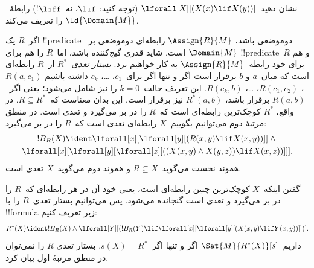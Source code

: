 \documentclass[../../../include/open-logic-section]{subfiles}
\begin{document}
\begin{prob}
نشان دهید~$\lforall[X][(X(x) \lif X(y))]$ (توجه کنید:
$\lif$، نه~$\liff$!) رابطهٔ~$\Id{\Domain{M}}$ را تعریف می‌کند.
\end{prob}

\begin{ex}
اگر~$R$ یک !!{predicate} دوموضعی باشد، $\Assign{R}{M}$ رابطه‌ای
دوموضعی بر~$\Domain{M}$ است. شاید قدری گیج‌کننده باشد، اما~$R$ را هم
برای !!{predicate}~$R$ و هم برای خود رابطهٔ~$\Assign{R}{M}$ به کار
خواهیم برد. \emph{بستار تعدی}~$R^*$ از~$R$ رابطه‌ای است که میان~$a$ و
$b$ برقرار است اگر و تنها اگر برای~$c_1$، \dots، $c_k$ داشته باشیم
$R(a,c_1)$، $R(c_1, c_2)$، \dots، $R(c_k,b)$. این تعریف حالت~$k = 0$
را نیز شامل می‌شود؛ یعنی اگر~$R(a,b)$ برقرار باشد، $R^*(a,b)$ نیز
برقرار است. این بدان معناست که~$R \subseteq R^*$. در واقع، $R^*$
کوچک‌ترین رابطه‌ای است که~$R$ را در بر می‌گیرد و تعدی است. در منطق
مرتبهٔ دوم می‌توانیم بگوییم~$X$ رابطه‌ای تعدی است که~$R$ را در بر
می‌گیرد:
\begin{multline*}
  !B_R(X) \ident \lforall[x][\lforall[y][(R(x,y) \lif X(x, y))]] \land {}\\
\lforall[x][\lforall[y][\lforall[z][((X(x,y) \land X(y,z)) \lif X(x,
      z))]]].
\end{multline*}
هموند نخست می‌گوید~$R \subseteq X$ و هموند دوم می‌گوید~$X$ تعدی است.

گفتن اینکه~$X$ کوچک‌ترین چنین رابطه‌ای است، یعنی خود آن در هر رابطه‌ای
که~$R$ را در بر می‌گیرد و تعدی است گنجانده می‌شود. پس می‌توانیم بستار
تعدی~$R$ را با !!{formula} زیر تعریف کنیم:
\[
R^*(X) \ident !B_R(X) \land \lforall[Y][(!B_R(Y) \lif
  \lforall[x][\lforall[y][(X(x, y) \lif Y(x,y))]])].
\]
داریم~$\Sat{M}{R^*(X)}[s]$ اگر و تنها اگر~$s(X) = R^*$. بستار تعدی
$R$ را نمی‌توان در منطق مرتبهٔ اول بیان کرد.
\end{ex}
\end{document}
